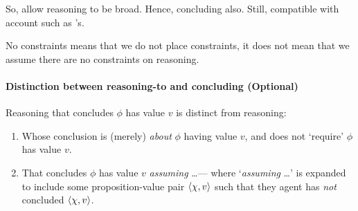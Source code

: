 \begin{note}
  So, allow reasoning to be broad.
  Hence, concluding also.
  Still, compatible with account such as \citeauthor{Wedgwood:2006ui}'s.

  No constraints means that we do not place constraints, it does not mean that we assume there are no constraints on reasoning.
\end{note}

\paragraph[Reasoning-to vs.\ concluding]{Distinction between reasoning-to and concluding \hfill (Optional)}

\begin{note}
  Reasoning that concludes \(\phi\) has value \(v\) is distinct from reasoning:
  \begin{enumerate}[label=\Alph*., ref=(\Alph*)]
  \item
    \label{CS:delicacy:O}
    Whose conclusion is (merely) \emph{about} \(\phi\) having value \(v\), and does not `require' \(\phi\) has value \(v\).
  \item
    \label{CS:delicacy:A}
    That concludes \(\phi\) has value \(v\) \emph{assuming} \dots\space --- where `\emph{assuming} \dots\space' is expanded to include some proposition-value pair \(\langle \chi, v \rangle\) such that they agent has \emph{not} concluded \(\langle \chi, v \rangle\).
  \end{enumerate}
\end{note}

